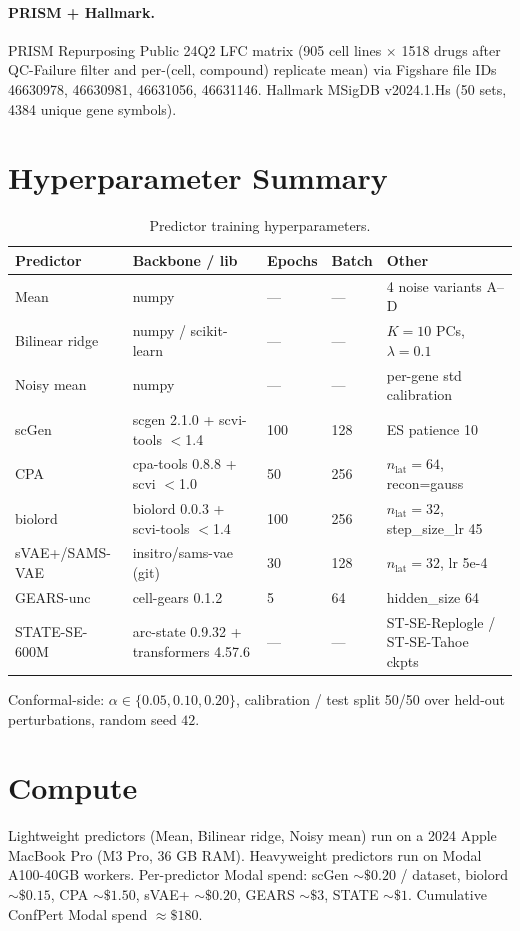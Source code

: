 \documentclass{article}
\begin{document}
\paragraph{PRISM + Hallmark.} PRISM Repurposing Public 24Q2 LFC matrix (905 cell lines $\times$ 1518 drugs after QC-Failure filter and per-(cell, compound) replicate mean) via Figshare file IDs 46630978, 46630981, 46631056, 46631146. Hallmark MSigDB v2024.1.Hs (50 sets, 4384 unique gene symbols).

\section{Hyperparameter Summary}
\label{app:hparams}

\begin{table}[h]
\caption{Predictor training hyperparameters.}
\label{tab:hparams}
\centering
\small
\begin{tabular}{lllll}
\toprule
Predictor       & Backbone / lib                   & Epochs   & Batch & Other \\
\midrule
Mean            & numpy                            & ---      & ---   & 4 noise variants A--D \\
Bilinear ridge  & numpy / scikit-learn             & ---      & ---   & $K = 10$ PCs, $\lambda = 0.1$ \\
Noisy mean      & numpy                            & ---      & ---   & per-gene std calibration \\
scGen           & scgen 2.1.0 + scvi-tools $<$1.4  & 100      & 128   & ES patience 10 \\
CPA             & cpa-tools 0.8.8 + scvi $<$1.0    & 50       & 256   & $n_{\text{lat}} = 64$, recon=gauss \\
biolord         & biolord 0.0.3 + scvi-tools $<$1.4 & 100     & 256   & $n_{\text{lat}} = 32$, step\_size\_lr 45 \\
sVAE+/SAMS-VAE  & insitro/sams-vae (git)           & 30       & 128   & $n_{\text{lat}} = 32$, lr 5e-4 \\
GEARS-unc       & cell-gears 0.1.2                 & 5        & 64    & hidden\_size 64 \\
STATE-SE-600M   & arc-state 0.9.32 + transformers 4.57.6 & --- & --- & ST-SE-Replogle / ST-SE-Tahoe ckpts \\
\bottomrule
\end{tabular}
\end{table}

Conformal-side: $\alpha \in \{0.05, 0.10, 0.20\}$, calibration / test split 50/50 over held-out perturbations, random seed $42$.

\section{Compute}
\label{app:compute}

Lightweight predictors (Mean, Bilinear ridge, Noisy mean) run on a 2024 Apple MacBook Pro (M3 Pro, 36 GB RAM). Heavyweight predictors run on Modal A100-40GB workers. Per-predictor Modal spend: scGen $\sim\$0.20$ / dataset, biolord $\sim\$0.15$, CPA $\sim\$1.50$, sVAE+ $\sim\$0.20$, GEARS $\sim\$3$, STATE $\sim\$1$. Cumulative ConfPert Modal spend $\approx \$180$.
\end{document}
